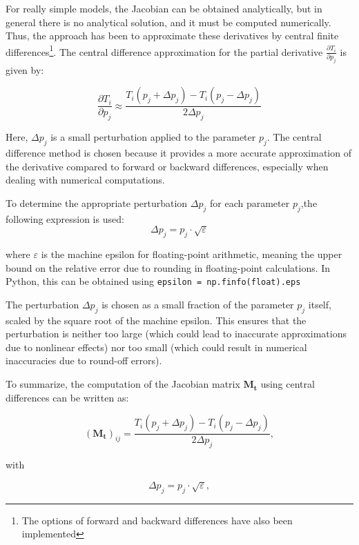 For really simple models, the Jacobian can be obtained analytically, but in general there is no analytical solution, and it must be computed numerically. Thus, the approach has been to approximate these derivatives by central finite differences\footnote{The options of forward and backward differences have also been implemented}. The central difference approximation for the partial derivative $\frac{\partial T_i}{\partial p_j}$ is given by:

\begin{equation}
    \frac{\partial T_i}{\partial p_j} \approx \frac{T_i(p_j + \Delta p_j) - T_i(p_j - \Delta p_j)}{2 \Delta p_j}
\end{equation}

Here, $\Delta p_j$ is a small perturbation applied to the parameter $p_j$. The central difference method is chosen because it provides a more accurate approximation of the derivative compared to forward or backward differences, especially when dealing with numerical computations.

To determine the appropriate perturbation $\Delta p_j$ for each parameter $p_j$,the following expression is used:
\begin{equation}
    \Delta p_j = p_j \cdot \sqrt{\varepsilon}
\end{equation}

where $\varepsilon$ is the machine epsilon for floating-point arithmetic, meaning the upper bound on the relative error due to rounding in floating-point calculations. In Python, this can be obtained using \lstinline{epsilon = np.finfo(float).eps}

The perturbation $\Delta p_j$ is chosen as a small fraction of the parameter $p_j$ itself, scaled by the square root of the machine epsilon. This  ensures that the perturbation is neither too large (which could lead to inaccurate approximations due to nonlinear effects) nor too small (which could result in numerical inaccuracies due to round-off errors).

To summarize, the computation of the Jacobian matrix $\bm{M_t}$ using central differences can be written as:


\begin{equation}
    \left(\bm{M_t}\right)_{ij} = \frac{T_i(p_j + \Delta p_j) - T_i(p_j - \Delta p_j)}{2 \Delta p_j},
\end{equation}

with


\begin{equation}
    \Delta p_j = p_j \cdot \sqrt{\varepsilon},
\end{equation}

